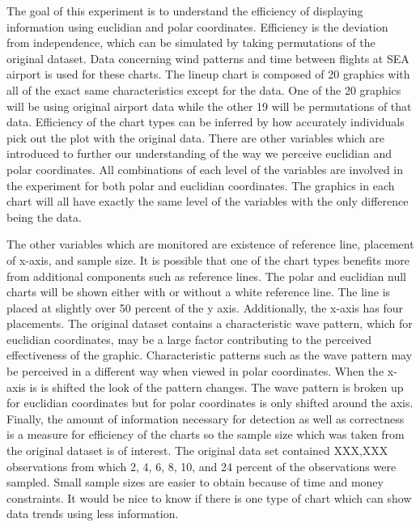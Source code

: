 The goal of this experiment is to understand the efficiency of displaying information using euclidian and polar coordinates. Efficiency is the deviation from independence, which can be simulated by taking permutations of the original dataset. Data concerning wind patterns and time between flights at SEA airport is used for these charts. The lineup chart is composed of 20 graphics with all of the exact same characteristics except for the data. One of the 20 graphics will be using original airport data while the other 19 will be permutations of that data. Efficiency of the chart types can be inferred by how accurately individuals pick out the plot with the original data. There are other variables which are introduced to further our understanding of the way we perceive euclidian and polar coordinates. All combinations of each level of the variables are involved in the experiment for both polar and euclidian coordinates. The graphics in each chart will all have exactly the same level of the variables with the only difference being the data. 

The other variables which are monitored are existence of reference line, placement of x-axis, and sample size. It is possible that one of the chart types benefits more from additional components such as reference lines. The polar and euclidian null charts will be shown either with or without a white reference line. The line is placed at slightly over 50 percent of the y axis. Additionally, the x-axis has four placements. The original dataset contains a characteristic wave pattern, which for euclidian coordinates, may be a large factor contributing to the perceived effectiveness of the graphic. Characteristic patterns such as the wave pattern may be perceived in a different way when viewed in polar coordinates. When the x-axis is is shifted the look of the pattern changes. The wave pattern is broken up for euclidian coordinates but for polar coordinates is only shifted around the axis. Finally, the amount of information necessary for detection as well as correctness is a measure for efficiency of the charts so the sample size which was taken from the original dataset is of interest. The original data set contained XXX,XXX observations from which 2, 4, 6, 8, 10, and 24 percent of the observations were sampled. Small sample sizes are easier to obtain because of time and money constraints. It would be nice to know if there is one type of chart which can show data trends using less information. 


